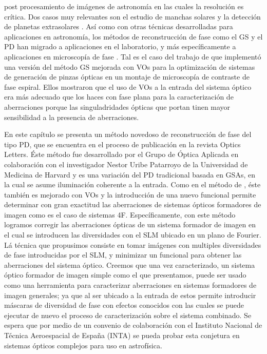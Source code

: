 post procesamiento de imágenes de astronomía en las cuales la
resolución es crítica. Dos casos muy relevantes son el estudio de
manchas solares y la detección de planetas extrasolares . 
Así como con otras técnicas desarrolladas para aplicaciones en
astronomía, los métodos de reconstrucción de fase como el
GS y el PD han migrado a aplicaciones en el
laboratorio, y más específicamente a aplicaciones en microscopía de
fase . Tal es el caso
del trabajo de  que implementó una versión del
método GS mejorada con VOs para la optimización de sistemas de
generación de pinzas ópticas en un montaje de microscopía de
contraste de fase espiral.  Ellos mostraron que el uso de VOs a la
entrada del sistema óptico era más adecuado que los haces con fase
plana para la caracterización de aberraciones porque las
singuladridades ópticas que portan tinen mayor sensibilidad a la 
presencia de aberraciones. 

En este capítulo se presenta un método novedoso de reconstrucción de
fase del tipo PD, que se encuentra en el proceso de publicación en la
revista Optics Letters. Éste método fue desarrollado por el Grupo de Óptica Aplicada en
colaboración con el investigador Nestor Uribe Patarroyo de la
Universidad de Medicina de 
Harvard y es una variación del PD tradicional basada en GSAs, en la
cual se asume iluminación coherente a la entrada. Como en el método de
, éste también es mejorado con VOs y la
introducción de una nuevo funcional permite determinar con gran exactitud las
aberraciones de sistemas ópticos formadores de imagen como es el caso
de sistemas 4F.  Específicamente, con este método logramos corregir las aberraciones ópticas
de un sistema formador de imagen en el cual se introducen las
diversidades con el SLM ubicado en un plano de Fourier.
Lá técnica que propusimos consiste en tomar imágenes con multiples
diversidades de fase introducidas por el SLM, y minimizar un funcional 
para obtener las aberraciones del sistema óptico. 
Creemos que una vez caracterizado, un sistema óptico formador de
imagen simple como el que presentamos, puede ser usado como una herramienta para
caracterizar aberraciones en sistemas formadores de imagen generales;
ya que al ser ubicado a la entrada de estos permite introducir
máscaras de diversidad de fase con efectos conocidos con las cuales se
puede ejecutar de nuevo el proceso de caracterización sobre el sistema
combinado. Se espera que por medio de un convenio de colaboración con
el Instituto Nacional de Técnica Aeroespacial de España  (INTA) se
pueda probar esta conjetura en sistemas ópticos
complejos para uso en astrofísica. 

